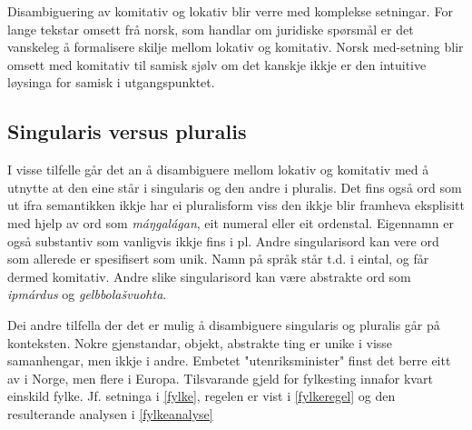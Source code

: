 \documentclass[a4paper,nynorsk]{article}
\begin{document}
Disambiguering av komitativ og lokativ blir verre med komplekse setningar. For lange tekstar omsett frå norsk, som handlar om juridiske spørsmål er det vanskeleg å formalisere skilje mellom lokativ og komitativ. Norsk med-setning blir omsett med komitativ til samisk sjølv om det kanskje ikkje er den intuitive løysinga for samisk i utgangspunktet. %




\subsection{Singularis versus pluralis}

I visse tilfelle  går det an å disambiguere mellom lokativ og komitativ med å utnytte at den eine står i singularis og den andre i pluralis. %
Det fins også ord som ut ifra semantikken ikkje har ei pluralisform viss den ikkje blir framheva eksplisitt med hjelp av ord som \textit{máŋgalágan}, eit numeral eller eit ordenstal. Eigennamn er også substantiv som vanligvis ikkje fins i pl. Andre singularisord kan vere ord som allerede er spesifisert som unik. Namn på språk står t.d. i eintal, og får dermed komitativ. Andre slike singularisord kan være abstrakte ord som \emph{ipmárdus} og \emph{gelbbolašvuohta}. %

Dei andre tilfella der det er mulig å disambiguere singularis og pluralis går på konteksten. Nokre gjenstandar, objekt, abstrakte ting er unike i visse samanhengar, men ikkje i andre. Embetet "utenriksminister" finst det berre eitt av i Norge, men flere i Europa. Tilsvarande gjeld for fylkesting innafor kvart einskild fylke. Jf. setninga i \ref{fylke}, regelen er vist i \ref{fylkeregel} og den resulterande analysen i \ref{fylkeanalyse} %
\end{document}
